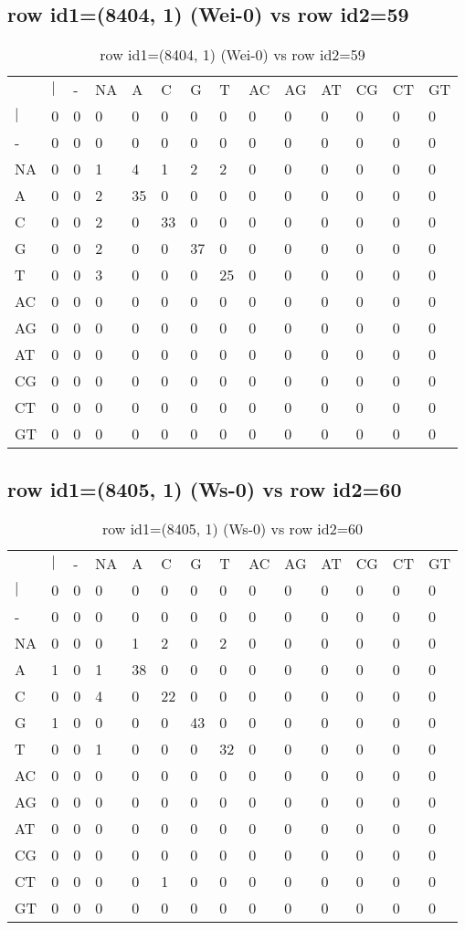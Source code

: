 \subsection{row id1=(8404, 1) (Wei-0) vs row id2=59}
\begin{center}
\begin{longtable}{|l|l|l|l|l|l|l|l|l|l|l|l|l|l|}
\caption{row id1=(8404, 1) (Wei-0) vs row id2=59} \label{table_dm468}\\
\hline
\\
\hline
&$|$&-&NA&A&C&G&T&AC&AG&AT&CG&CT&GT\\
$|$&0&0&0&0&0&0&0&0&0&0&0&0&0\\
-&0&0&0&0&0&0&0&0&0&0&0&0&0\\
NA&0&0&1&4&1&2&2&0&0&0&0&0&0\\
A&0&0&2&35&0&0&0&0&0&0&0&0&0\\
C&0&0&2&0&33&0&0&0&0&0&0&0&0\\
G&0&0&2&0&0&37&0&0&0&0&0&0&0\\
T&0&0&3&0&0&0&25&0&0&0&0&0&0\\
AC&0&0&0&0&0&0&0&0&0&0&0&0&0\\
AG&0&0&0&0&0&0&0&0&0&0&0&0&0\\
AT&0&0&0&0&0&0&0&0&0&0&0&0&0\\
CG&0&0&0&0&0&0&0&0&0&0&0&0&0\\
CT&0&0&0&0&0&0&0&0&0&0&0&0&0\\
GT&0&0&0&0&0&0&0&0&0&0&0&0&0\\
\hline
\end{longtable}
\end{center}

\subsection{row id1=(8405, 1) (Ws-0) vs row id2=60}
\begin{center}
\begin{longtable}{|l|l|l|l|l|l|l|l|l|l|l|l|l|l|}
\caption{row id1=(8405, 1) (Ws-0) vs row id2=60} \label{table_dm470}\\
\hline
\\
\hline
&$|$&-&NA&A&C&G&T&AC&AG&AT&CG&CT&GT\\
$|$&0&0&0&0&0&0&0&0&0&0&0&0&0\\
-&0&0&0&0&0&0&0&0&0&0&0&0&0\\
NA&0&0&0&1&2&0&2&0&0&0&0&0&0\\
A&1&0&1&38&0&0&0&0&0&0&0&0&0\\
C&0&0&4&0&22&0&0&0&0&0&0&0&0\\
G&1&0&0&0&0&43&0&0&0&0&0&0&0\\
T&0&0&1&0&0&0&32&0&0&0&0&0&0\\
AC&0&0&0&0&0&0&0&0&0&0&0&0&0\\
AG&0&0&0&0&0&0&0&0&0&0&0&0&0\\
AT&0&0&0&0&0&0&0&0&0&0&0&0&0\\
CG&0&0&0&0&0&0&0&0&0&0&0&0&0\\
CT&0&0&0&0&1&0&0&0&0&0&0&0&0\\
GT&0&0&0&0&0&0&0&0&0&0&0&0&0\\
\hline
\end{longtable}
\end{center}

